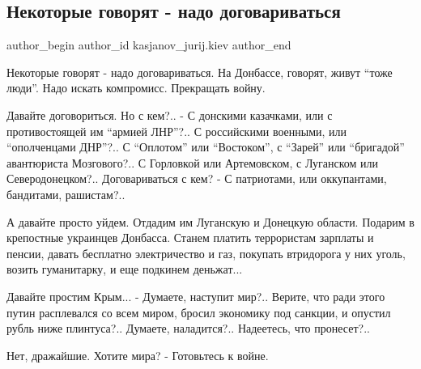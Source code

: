  
 
 
 
 
 
\subsection{Некоторые говорят - надо договариваться}
\label{sec:27_12_2014.fb.kasjanov_jurij.kiev.1.nado_dogovarivatsja}
 
\ifcmt
 author_begin
   author_id kasjanov_jurij.kiev
 author_end
\fi

Некоторые говорят - надо договариваться. На Донбассе, говорят, живут \enquote{тоже
люди}. Надо искать компромисс. Прекращать войну. 

Давайте договориться. Но с кем?.. - С донскими казачками, или с противостоящей
им \enquote{армией ЛНР}?.. С российскими военными, или \enquote{ополченцами ДНР}?.. С \enquote{Оплотом}
или \enquote{Востоком}, с \enquote{Зарей} или \enquote{бригадой} авантюриста Мозгового?.. С Горловкой
или Артемовском, с Луганском или Северодонецком?.. Договариваться с кем? - С
патриотами, или оккупантами, бандитами, рашистам?..

А давайте просто уйдем. Отдадим им Луганскую и Донецкую области. Подарим в
крепостные украинцев Донбасса. Станем платить террористам зарплаты и пенсии,
давать бесплатно электричество и газ, покупать втридорога у них уголь, возить
гуманитарку, и еще подкинем деньжат... 

Давайте простим Крым... - Думаете, наступит мир?.. Верите, что ради этого путин
расплевался со всем миром, бросил экономику под санкции, и опустил рубль ниже
плинтуса?.. Думаете, наладится?.. Надеетесь, что пронесет?.. 

Нет, дражайшие.  Хотите мира? - Готовьтесь к войне.

